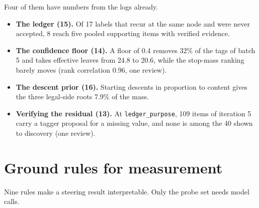 \documentclass[10pt,a4paper]{article}
\newcommand{\code}[1]{\texttt{#1}}
\begin{document}
Four of them have numbers from the logs already.
\begin{itemize}
\item \textbf{The ledger (15).} Of 17 labels that recur at the same node and were never accepted, 8 reach five pooled supporting items with verified evidence.
\item \textbf{The confidence floor (14).} A floor of 0.4 removes 32\% of the tags of batch 5 and takes effective leaves from 24.8 to 20.6, while the stop-mass ranking barely moves (rank correlation 0.96, one review).
\item \textbf{The descent prior (16).} Starting descents in proportion to content gives the three legal-side roots 7.9\% of the mass.
\item \textbf{Verifying the residual (13).} At \code{ledger\_purpose}, 109 items of iteration 5 carry a tagger proposal for a missing value, and none is among the 40 shown to discovery (one review).
\end{itemize}

\section{Ground rules for measurement}

Nine rules make a steering result interpretable. Only the probe set needs model calls.
\end{document}
